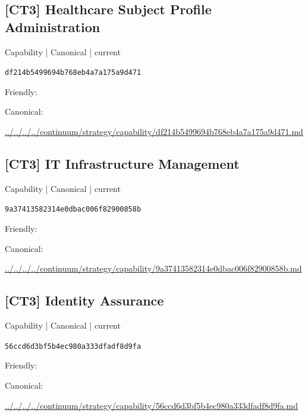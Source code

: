 \documentclass[10pt,a4paper]{article}
\begin{document}
\subsection*{[CT3] Healthcare Subject Profile Administration}
{\small Capability | Canonical | current}\par
\texttt{df214b5499694b768eb4a7a175a9d471}\par
Friendly: \par
Canonical: \par
{\footnotesize\url{../../../../continuum/strategy/capability/df214b5499694b768eb4a7a175a9d471.md}}\par
\subsection*{[CT3] IT Infrastructure Management}
{\small Capability | Canonical | current}\par
\texttt{9a37413582314e0dbac006f82900858b}\par
Friendly: \par
Canonical: \par
{\footnotesize\url{../../../../continuum/strategy/capability/9a37413582314e0dbac006f82900858b.md}}\par
\subsection*{[CT3] Identity Assurance}
{\small Capability | Canonical | current}\par
\texttt{56ccd6d3bf5b4ec980a333dfadf8d9fa}\par
Friendly: \par
Canonical: \par
{\footnotesize\url{../../../../continuum/strategy/capability/56ccd6d3bf5b4ec980a333dfadf8d9fa.md}}\par
\end{document}
